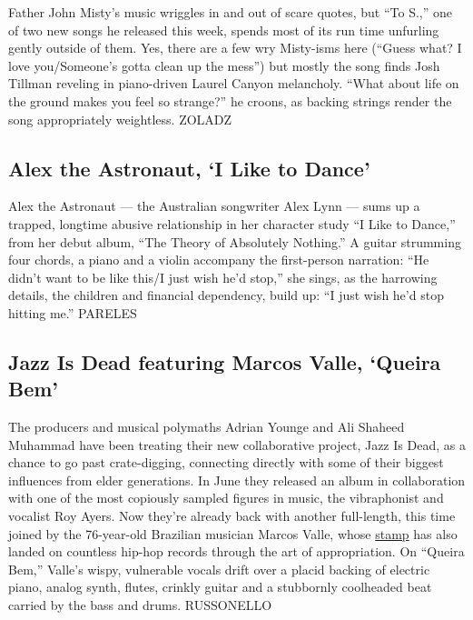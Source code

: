 Father John Misty's music wriggles in and out of scare quotes, but ``To
S.,'' one of two new songs he released this week, spends most of its run
time unfurling gently outside of them. Yes, there are a few wry
Misty-isms here (``Guess what? I love you/Someone's gotta clean up the
mess'') but mostly the song finds Josh Tillman reveling in piano-driven
Laurel Canyon melancholy. ``What about life on the ground makes you feel
so strange?'' he croons, as backing strings render the song
appropriately weightless. ZOLADZ

\hypertarget{alex-the-astronaut-i-like-to-dance}{%
\subsection{Alex the Astronaut, `I Like to
Dance'}\label{alex-the-astronaut-i-like-to-dance}}

Alex the Astronaut --- the Australian songwriter Alex Lynn --- sums up a
trapped, longtime abusive relationship in her character study ``I Like
to Dance,'' from her debut album, ``The Theory of Absolutely Nothing.''
A guitar strumming four chords, a piano and a violin accompany the
first-person narration: ``He didn't want to be like this/I just wish
he'd stop,'' she sings, as the harrowing details, the children and
financial dependency, build up: ``I just wish he'd stop hitting me.''
PARELES

\hypertarget{jazz-is-dead-featuring-marcos-valle-queira-bem}{%
\subsection{Jazz Is Dead featuring Marcos Valle, `Queira
Bem'}\label{jazz-is-dead-featuring-marcos-valle-queira-bem}}

The producers and musical polymaths Adrian Younge and Ali Shaheed
Muhammad have been treating their new collaborative project, Jazz Is
Dead, as a chance to go past crate-digging, connecting directly with
some of their biggest influences from elder generations. In June they
released an album in collaboration with one of the most copiously
sampled figures in music, the vibraphonist and vocalist Roy Ayers. Now
they're already back with another full-length, this time joined by the
76-year-old Brazilian musician Marcos Valle, whose
\href{https://www.waxpoetics.com/blog/features/articles/rockin-eternally-leon-ware-marcos-valle-story/}{stamp}
has also landed on countless hip-hop records through the art of
appropriation. On ``Queira Bem,'' Valle's wispy, vulnerable vocals drift
over a placid backing of electric piano, analog synth, flutes, crinkly
guitar and a stubbornly coolheaded beat carried by the bass and drums.
RUSSONELLO

